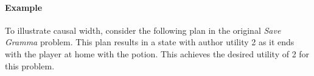 \documentclass[letterpaper]{article} %
\begin{document}




\paragraph{Example}
To illustrate causal width, consider the following plan in the original \textit{Save Gramma} problem. This plan results in a state with author utility 2 as it ends with the player at home with the potion. This achieves the desired utility of 2 for this problem.
\end{document}
